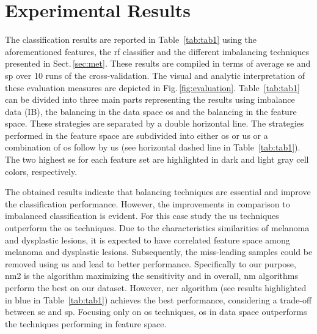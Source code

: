 \section{Experimental Results}
\label{sec:exp-res} 

The classification results are reported in Table~\ref{tab:tab1} using the aforementioned features, the \ac{rf} classifier and the different imbalancing techniques presented in Sect.\,\ref{sec:met}. 
These results are compiled in terms of average \ac{se} and \ac{sp} over 10 runs of the cross-validation.
The visual and analytic interpretation of these evaluation measures are depicted in Fig.\,\ref{fig:evaluation}.
Table~\ref{tab:tab1} can be divided into three main parts representing the results using imbalance data (IB), the balancing in the data space \ac{os} and the balancing in the feature space.
These strategies are separated by a double horizontal line.
The strategies performed in the feature space are subdivided into either \ac{os} or \ac{us} or a combination of \ac{os} follow by \ac{us} (see horizontal dashed line in Table~\ref{tab:tab1}).
The two highest \ac{se} for each feature set are highlighted in dark and light gray cell colors, respectively. 

The obtained results indicate that balancing techniques are essential and improve the classification performance. 
However, the improvements in comparison to imbalanced classification is evident. 
For this case study the \ac{us} techniques outperform the \ac{os} techniques. 
Due to the characteristics similarities of melanoma and dysplastic lesions, it is expected to have correlated feature space among melanoma and dysplastic lesions. 
Subsequently, the miss-leading samples could be removed using \ac{us} and lead to better performance.
Specifically to our purpose, \ac{nm2} is the algorithm maximizing the sensitivity and in overall, \ac{nm} algorithms perform the best on our dataset. 
However, \ac{ncr} algorithm (see results highlighted in blue in Table~\ref{tab:tab1}) achieves the best performance, considering a trade-off between \ac{se} and \ac{sp}. 
Focusing only on \ac{os} techniques, \ac{os} in data space outperforms the techniques performing in feature space.



